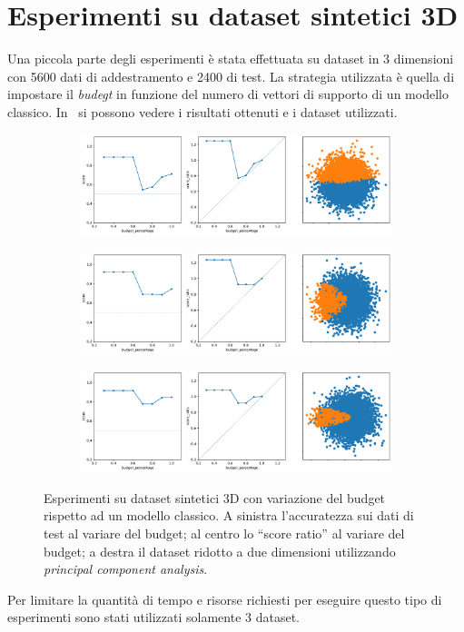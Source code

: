 \section{Esperimenti su dataset sintetici 3D}\label{sec:exp:synth_3d}
Una piccola parte degli esperimenti è stata effettuata su dataset in 3 dimensioni con 5600 dati di addestramento e 2400 di test.
La strategia utilizzata è quella di impostare il \emph{budegt} in funzione del numero di vettori di supporto di un modello classico. 
In~ si possono vedere i risultati ottenuti e i dataset utilizzati.
\begin{figure}
    \begin{subfigure}{\textwidth}
        \centering
        \includegraphics[width=\textwidth]{img/3d/1.pdf}
    \end{subfigure}%
    \hfill
    \begin{subfigure}{\textwidth}
        \centering
        \includegraphics[width=\textwidth]{img/3d/2.pdf}
    \end{subfigure}%
    \hfill
    \begin{subfigure}{\textwidth}
        \centering
        \includegraphics[width=\textwidth]{img/3d/3.pdf}
    \end{subfigure}%
\caption{Esperimenti su dataset sintetici 3D con variazione del budget rispetto ad un modello classico. A sinistra l'accuratezza sui dati di test al variare del budget; al centro lo ``score ratio'' al variare del budget; a destra il dataset ridotto a due dimensioni utilizzando \emph{principal component analysis}.}
\label{fig:3d_exp}
\end{figure}
Per limitare la quantità di tempo e risorse richiesti per eseguire questo tipo di esperimenti sono stati utilizzati solamente 3 dataset.

